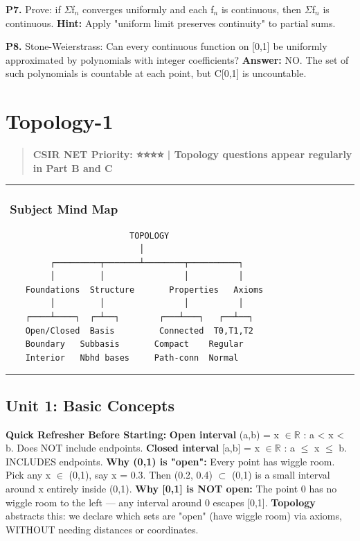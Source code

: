 \documentclass[12pt,a4paper,openany]{book}
\begin{document}
{{\textbf{P7.} Prove: if $\Sigma$f$_n$ converges uniformly and each f$_n$ is continuous, then $\Sigma$f$_n$ is continuous.
\textbf{Hint:} Apply "uniform limit preserves continuity" to partial sums.

\textbf{P8.} Stone-Weierstrass: Can every continuous function on [0,1] be uniformly approximated by polynomials with integer coefficients?
\textbf{Answer:} NO. The set of such polynomials is countable at each point, but C[0,1] is uncountable.

\newpage

\chapter{Topology-1}


\begin{quote}
\textbf{CSIR NET Priority: ⭐⭐⭐⭐ | Topology questions appear regularly in Part B and C}
\end{quote}

\bigskip\noindent\rule{\textwidth}{0.4pt}\bigskip

\subsection{️ Subject Mind Map}

\begin{verbatim}
                         TOPOLOGY
                           │
         ┌─────────┬───────┴────────┬──────────┐
         │         │                │          │
    Foundations  Structure       Properties   Axioms
         │         │                │          │
    ┌────┴────┐  ┌─┴──┐        ┌───┴───┐   ┌──┴──┐
    Open/Closed  Basis         Connected  T0,T1,T2
    Boundary   Subbasis       Compact    Regular
    Interior   Nbhd bases     Path-conn  Normal
\end{verbatim}

\bigskip\noindent\rule{\textwidth}{0.4pt}\bigskip

\section{Unit 1: Basic Concepts}

\begin{prereqbox}
 \textbf{Quick Refresher Before Starting:}
\textbf{Open interval} (a,b) = {x $\in\mathbb{R}$ : a < x < b}. Does NOT include endpoints.
\textbf{Closed interval} [a,b] = {x $\in\mathbb{R}$ : a $\leq$ x $\leq$ b}. INCLUDES endpoints.
\textbf{Why (0,1) is "open":} Every point has wiggle room. Pick any x $\in$ (0,1), say x = 0.3. Then (0.2, 0.4) $\subset$ (0,1) is a small interval around x entirely inside (0,1). 
\textbf{Why [0,1] is NOT open:} The point 0 has no wiggle room to the left — any interval around 0 escapes [0,1].
\textbf{Topology} abstracts this: we declare which sets are "open" (have wiggle room) via axioms, WITHOUT needing distances or coordinates.
\end{prereqbox}



}}
\end{document}
